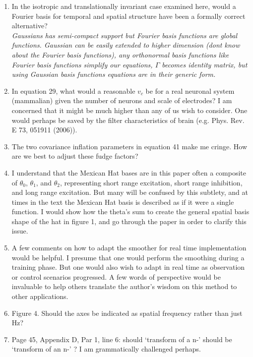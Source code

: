 \documentclass{article}
\begin{document}
\begin{enumerate}
\item In the isotropic and translationally invariant case examined here, would a Fourier basis for temporal and spatial structure have been a formally correct alternative?\\
\emph{Gaussians has semi-compact support but Fourier basis functions are global functions. Gaussian can be easily extended to higher dimension (dont know about the Fourier basis functions), any orthonormal basis functions like Fourier basis functions simplify our equations, $\Gamma$ becomes identity matrix, but using Gaussian basis functions equations are in their generic form.}
\item In equation 29, what would a reasonable $v_c$ be for a real neuronal system (mammalian) given the number of neurons and scale of electrodes? I am concerned that it might be much higher than any of us wish to consider. One would perhaps be saved by the filter characteristics of brain (e.g. Phys. Rev. E 73, 051911 (2006)).
\item The two covariance inflation parameters in equation 41 make me cringe. How are we best to adjust these fudge factors?
\item I understand that the Mexican Hat bases are in this paper often a composite of $\theta_0$, $\theta_1$, and $\theta_2$, representing short range excitation, short range inhibition, and long range excitation. But many will be confused by this subtlety, and at times in the text the Mexican Hat basis is described as if it were a single function. I would show how the theta's sum to create the general spatial basis shape of the hat in figure 1, and go through the paper in order to clarify this issue.
\item A few comments on how to adapt the smoother for real time implementation would be helpful. I presume that one would perform the smoothing during a training phase. But one would also wish to adapt in real time as observation or control scenarios progressed. A few words of perspective would be invaluable to help others translate the author's wisdom on this method to other applications.
\item Figure 4. Should the axes be indicated as spatial frequency rather than just Hz?
\item Page 45, Appendix D, Par 1, line 6: should `transform of a n-' should be `transform of an n-' ? I am grammatically challenged perhaps.
\end{enumerate}
\end{document}
